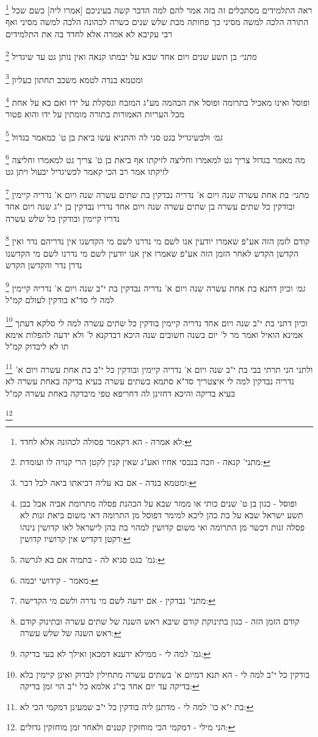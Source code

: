 \documentclass[12pt, openany]{book}
\newcommand{\footnotecomment}[1]{
	\renewcommand\thefootnote{}
	\footnote{#1}}
\newcommand{\commenta}[1]{\footnotecomment{#1}}
\begin{document}
{\commenta{לא אמרה - הא דקאמר פסולה לכהונה אלא לחדד:}
ראה התלמידים מסתכלים זה בזה אמר להם למה הדבר קשה בעיניכם [אמרו ליה] כשם שכל התורה הלכה למשה מסיני כך פחותה מבת שלש שנים כשרה לכהונה הלכה למשה מסיני ואף רבי עקיבא לא אמרה אלא לחדד בה את התלמידים
\commenta{מתני' קנאה - וזכה בנכסי אחיו ואע"ג שאין קנין לקטן הרי קנויה לו ועומדת:}
{\large\emph{מתני׳}} בן תשע שנים ויום אחד שבא על יבמתו קנאה ואין נותן גט עד שיגדיל
\commenta{ומטמא בנדה - אם בא עליה דביאתו ביאה לכל דבר:}
ומטמא בנדה לטמא משכב תחתון כעליון 
\commenta{ופוסל - כגון בן ט' שנים כותי או ממזר שבא על הכהנת פסלה מתרומת אביה אבל בבן תשע ישראל שבא על בת כהן ליכא למימר דפוסל מן התרומה דאי משום ביאת זנות לא פסלה זנות דכשר מן התרומה ואי משום קדושין למהוי בת כהן לישראל לאו קדושין נינהו דקטן דקדיש אין קדושיו קדושין:}
ופוסל ואינו מאכיל בתרומה ופוסל את הבהמה מע"ג המזבח ונסקלת על ידו ואם בא על אחת מכל העריות האמורות בתורה מומתין על ידו והוא פטור
\commenta{גמ' בגט סגיא לה - בתמיה אם בא לגרשה:}
{\large\emph{גמ׳}} ולכשיגדיל בגט סגי לה והתניא עשו ביאת בן ט' כמאמר בגדול
\commenta{מאמר - קידושי יבמה:}
מה מאמר בגדול צריך גט למאמרו וחליצה לזיקתו אף ביאת בן ט' צריך גט למאמרו וחליצה לזיקתו 
אמר רב הכי קאמר
לכשיגדיל יבעול ויתן גט
\commenta{מתני' נבדקין - אם ידעה לשם מי נדרה ולשם מי הקדישה:
}
{\large\emph{מתני׳}} בת אחת עשרה שנה ויום א' נדריה נבדקין בת שתים עשרה שנה ויום א' נדריה קיימין ובודקין כל שתים עשרה
בן שתים עשרה שנה ויום אחד נדריו נבדקין בן י"ג שנה ויום אחד נדריו קיימין ובודקין כל שלש עשרה 
\commenta{קודם הזמן הזה - כגון בתינוקת קודם שיבא ראש השנה של שתים עשרה ובתינוק קודם ראש השנה של שלש עשרה:}
קודם לזמן הזה אע"פ שאמרו יודעין אנו לשם מי נדרנו לשם מי הקדשנו אין נדריהם נדר ואין הקדשן הקדש לאחר הזמן הזה אע"פ שאמרו אין אנו יודעין לשם מי נדרנו לשם מי הקדשנו נדרן נדר והקדשן הקדש
\commenta{גמ' למה לי - ממילא ידענא דמכאן ואילך לא בעי בדיקה:}
{\large\emph{גמ׳}} וכיון דתנא בת אחת עשרה שנה ויום א' נדריה נבדקין בת י"ב שנה ויום א' נדריה קיימין למה לי סד"א בודקין לעולם קמ"ל 
\commenta{בודקין כל י"ב למה לי - הא תנא דמיום א' בשתים עשרה מתחילין לבדוק ואינן קיימין בלא בדיקה עד יום אחד בי"ג אלמא כל י"ב הוי זמן בדיקה:}
וכיון דתני בת י"ב שנה ויום אחד נדריה קיימין בודקין כל שתים עשרה למה לי סלקא דעתך אמינא הואיל ואמר מר ל' יום בשנה חשובים שנה היכא דבדקנא ל' ולא ידעה להפלות אימא תו לא ליבדוק קמ"ל 
\commenta{בת י"א כו' למה לי - מדתנן ליה בודקין כל י"ב שמעינן דמקמי הכי לא:}
ולתני הני תרתי בבי בת י"ב שנה ויום א' נדריה קיימין ובודקין כל י"ב בת אחת עשרה ויום א' נדריה נבדקין למה לי 
איצטריך סד"א סתמא בשתים עשרה בעיא בדיקה באחת עשרה לא בעיא בדיקה והיכא דחזינן לה דחריפא טפי מיבדקה באחת עשרה קמ"ל 
\commenta{הני מילי - דמקמי הכי מוחזקין קטנים ולאחר זמן מוחזקין גדולים:}
}
\end{document}
